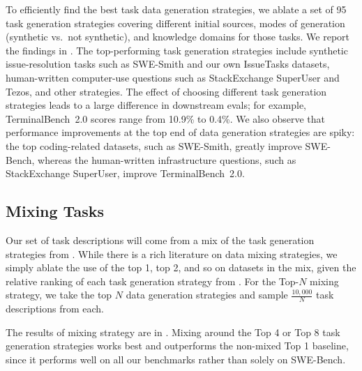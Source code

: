\documentclass{llmxive}
\begin{document}
To efficiently find the best task data generation strategies, we ablate a set of 95 task generation strategies covering different initial sources, modes of generation (synthetic vs.\ not synthetic), and knowledge domains for those tasks. We report the findings in . The top-performing task generation strategies include synthetic issue-resolution tasks such as SWE-Smith and our own IssueTasks datasets, human-written computer-use questions such as StackExchange SuperUser and Tezos, and other strategies. The effect of choosing different task generation strategies leads to a large difference in downstream evals; for example, TerminalBench~2.0 scores range from 10.9\% to 0.4\%. We also observe that performance improvements at the top end of data generation strategies are spiky: the top coding-related datasets, such as SWE-Smith, greatly improve SWE-Bench, whereas the human-written infrastructure questions, such as StackExchange SuperUser, improve TerminalBench~2.0.

\subsection{Mixing Tasks}
\label{sec:mixing_tasks}

Our set of task descriptions will come from a mix of the task generation strategies from . While there is a rich literature on data mixing strategies, we simply ablate the use of the top 1, top 2, and so on datasets in the mix, given the relative ranking of each task generation strategy from . For the Top-$N$ mixing strategy, we take the top $N$ data generation strategies and sample $\frac{10{,}000}{N}$ task descriptions from each.

The results of mixing strategy are in . Mixing around the Top 4 or Top 8 task generation strategies works best and outperforms the non-mixed Top 1 baseline, since it performs well on all our benchmarks rather than solely on SWE-Bench.
\end{document}
